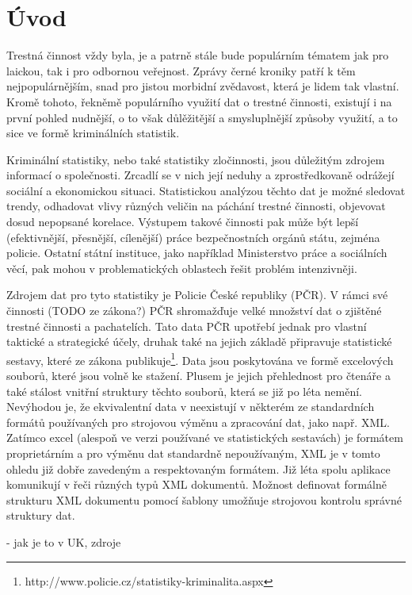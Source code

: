 \chapter*{Úvod}

Trestná činnost vždy byla, je a patrně stále bude populárním tématem jak pro laickou, tak i pro odbornou veřejnost. Zprávy černé kroniky patří k těm nejpopulárnějším, snad pro jistou morbidní zvědavost, která je lidem tak vlastní. Kromě tohoto, řekněmě populárního využití dat o trestné činnosti, existují i na první pohled nudnější, o to však důlěžitější a smysluplnější způsoby využití, a to sice ve formě kriminálních statistik.

Kriminální statistiky, nebo také statistiky zločinnosti, jsou důležitým zdrojem informací o společnosti. Zrcadlí se v nich její neduhy a zprostředkovaně odrážejí sociální a ekonomickou situaci. Statistickou analýzou těchto dat je možné sledovat trendy, odhadovat vlivy různých veličin na páchání trestné činnosti, objevovat dosud nepopsané korelace. Výstupem takové činnosti pak může být lepší (efektivnější, přesnější, cílenější) práce bezpečnostních orgánů státu, zejména policie. Ostatní státní instituce, jako například Ministerstvo práce a sociálních věcí, pak mohou v problematických oblastech řešit problém intenzivněji.

Zdrojem dat pro tyto statistiky je Policie České republiky (PČR). V rámci své činnosti (TODO ze zákona?) PČR shromažďuje velké množství dat o zjištěné trestné činnosti a pachatelích. Tato data PČR upotřebí jednak pro vlastní taktické a strategické účely, druhak také na jejich základě připravuje statistické sestavy, které ze zákona publikuje\footnote{http://www.policie.cz/statistiky-kriminalita.aspx}. Data jsou poskytována ve formě excelových souborů, které jsou volně ke stažení. Plusem je jejich přehlednost pro čtenáře a také stálost vnitřní struktury těchto souborů, která se již po léta nemění. Nevýhodou je, že ekvivalentní data v neexistují v některém ze standardních formátů používaných pro strojovou výměnu a zpracování dat, jako např. XML. Zatímco excel (alespoň ve verzi používané ve statistických sestavách) je formátem proprietárním a pro výměnu dat standardně nepoužívaným, XML je v tomto ohledu již dobře zavedeným a respektovaným formátem. Již léta spolu aplikace komunikují v řeči různých typů XML dokumentů. Možnost definovat formálně strukturu XML dokumentu pomocí šablony umožňuje strojovou kontrolu správné struktury dat.

- jak je to v UK, zdroje